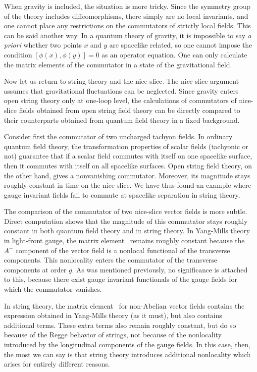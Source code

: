 When gravity is included, the situation is more tricky.  Since
the symmetry group of the theory includes diffeomorphisms, there
simply are no local invariants, and one cannot place any restrictions
on the commutators of strictly local fields.  This can be said
another way.
In a quantum theory of gravity, it is impossible to say {\it a
priori} whether two points $x$ and $y$ are spacelike related, so one
cannot impose the condition $[\phi(x),\phi(y)]=0$ as an operator
equation.  One can only calculate the matrix elements of the
commutator in a state of the gravitational field.

Now let us return to string theory and the nice slice.  The
nice-slice
argument assumes that gravitational fluctuations can be
neglected.  Since gravity enters open string theory only at one-loop
level, the calculations of commutators of nice-slice fields
obtained from open string field theory can be directly compared to
their counterparts obtained from quantum field theory in a fixed
background.

Consider first the commutator of two uncharged tachyon fields.
In ordinary quantum field theory, the transformation properties of
scalar fields (tachyonic or not) guarantee that if a scalar field
commutes with itself on one spacelike surface, then it commutes with
itself on all spacelike surfaces.  Open string field theory, on the
other hand, gives a nonvanishing commutator.  Moreover, its
magnitude stays roughly constant in time on the nice slice.
We have thus found an example where gauge invariant fields
fail to commute at spacelike separation in string theory.

The comparison of the commutator of two nice-slice vector fields is
more subtle.  Direct computation shows that the magnitude of this
commutator stays roughly constant in both quantum field theory and in
string theory.  In Yang-Mills theory in light-front gauge, the matrix
element \goobfour\ remains roughly constant because the $A^-$
component of the vector field is a nonlocal functional of the
transverse components.  This nonlocality enters the commutator of the
transverse components at order $g$.  As was mentioned previously, no
significance is attached to this, because there exist gauge invariant
functionals of the gauge fields for which the commutator vanishes.

In string theory, the matrix element \goobfour\ for non-Abelian
vector fields contains the expression obtained in Yang-Mills theory
(as it must), but also contains additional terms.  These extra terms
also remain roughly constant, but do so because of the Regge behavior
of strings, not because of the nonlocality introduced by the
longitudinal components of the gauge fields.  In this case, then, the
most we can say is that string theory introduces additional
nonlocality which arises for entirely different reasons.

